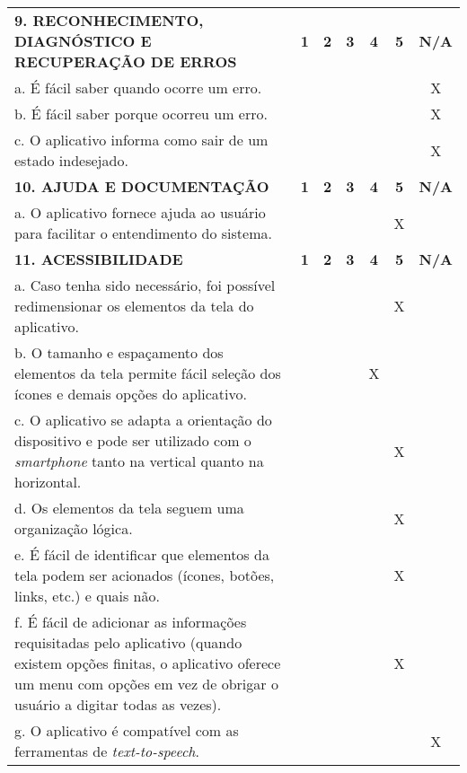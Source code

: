 \documentclass[portuguese,oneside]{tcc}
\begin{document}
\begin{center}
\begin{longtabu}{|L{25em}|c|c|c|c|c|c|}
																																\textbf{9. RECONHECIMENTO, DIAGNÓSTICO E RECUPERAÇÃO DE ERROS} & \textbf{1} & \textbf{2} & \textbf{3} & \textbf{4} & \textbf{5} & \textbf{N/A} \\ 
																																a. É fácil saber quando ocorre um erro.	& & & & & & X \\ 
																																b. É fácil saber porque ocorreu um erro. & & & & & & X \\ 
																																c. O aplicativo informa como sair de um estado indesejado. & & & & & & X \\ 
																																\textbf{10. AJUDA E DOCUMENTAÇÃO} & \textbf{1} & \textbf{2} & \textbf{3} & \textbf{4} & \textbf{5} & \textbf{N/A} \\ 
																																a. O aplicativo fornece ajuda ao usuário para facilitar o entendimento do sistema. & & & & & X & \\ 
																																\textbf{11. ACESSIBILIDADE} & \textbf{1} & \textbf{2} & \textbf{3} & \textbf{4} & \textbf{5} & \textbf{N/A} \\ 
																																a. Caso tenha sido necessário, foi possível redimensionar os elementos da tela do aplicativo. & & & & & X & \\ 
																																b. O tamanho e espaçamento dos elementos da tela permite fácil seleção dos ícones e demais opções do aplicativo. & & & & X & & \\ 
																																c. O aplicativo se adapta a orientação do dispositivo e pode ser utilizado com o \emph{smartphone} tanto na vertical quanto na horizontal. & & & & & X & \\ 
																																d. Os elementos da tela seguem uma organização lógica. & & & & & X & \\ 
																																e. É fácil de identificar que elementos da tela podem ser acionados (ícones, botões, links, etc.) e quais não. & & & & & X & \\ 
																																f. É fácil de adicionar as informações requisitadas pelo aplicativo (quando existem opções finitas, o aplicativo oferece um menu com opções em vez de obrigar o usuário a digitar todas as vezes). & & & & & X & \\ 
																																g. O aplicativo é compatível com as ferramentas de \emph{text-to-speech}. & & & & & & X \\ 

\end{longtabu}
\end{center}
\end{document}

